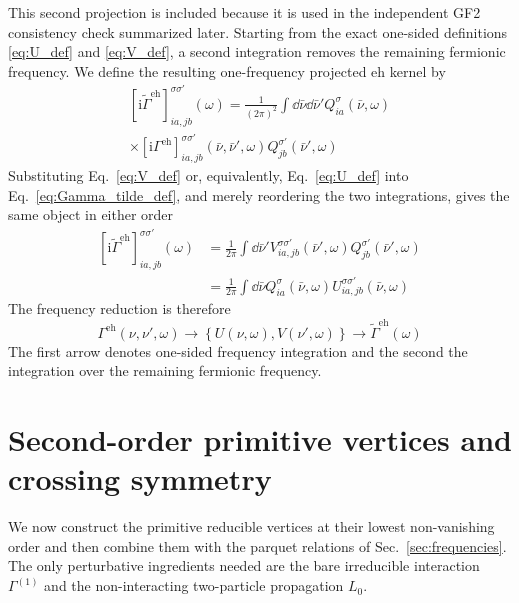 \documentclass[aip,jcp,reprint,noshowkeys,superscriptaddress]{revtex4-1}
\newcommand{\ii}{\mathrm{i}}
\newcommand{\eh}{\text{eh}}
\begin{document}
This second projection is included because it is used
in the independent GF2 consistency check summarized later.
Starting from the exact one-sided definitions
\eqref{eq:U_def} and \eqref{eq:V_def}, a second integration removes the
remaining fermionic frequency.
We define the resulting one-frequency projected $\eh$ kernel by
\begin{multline}
	\left[
	\ii\widetilde{\Gamma}^\eh
	\right]^{\sigma\sigma'}_{ia,jb}(\omega)
	=
	\frac{1}{(2\pi)^2}
	\int \dd{\bar\nu}\dd{\bar\nu'}
	Q^\sigma_{ia}(\bar\nu,\omega)
	\\
	\times
	\left[
	\ii\Gamma^\eh
	\right]^{\sigma\sigma'}_{ia,jb}(\bar\nu,\bar\nu',\omega)
	Q^{\sigma'}_{jb}(\bar\nu',\omega)
	\label{eq:Gamma_tilde_def}
\end{multline}
Substituting Eq.~\eqref{eq:V_def} or, equivalently,
Eq.~\eqref{eq:U_def} into Eq.~\eqref{eq:Gamma_tilde_def}, and merely
reordering the two integrations, gives the same object in either order
\begin{align}
	\left[
	\ii\widetilde{\Gamma}^\eh
	\right]^{\sigma\sigma'}_{ia,jb}(\omega)
	&=
	\frac{1}{2\pi}
	\int \dd{\bar\nu'}
	V^{\sigma\sigma'}_{ia,jb}(\bar\nu',\omega)
	Q^{\sigma'}_{jb}(\bar\nu',\omega)
	\label{eq:Gamma_tilde_from_V}
	\\
	&=
	\frac{1}{2\pi}
	\int \dd{\bar\nu}
	Q^\sigma_{ia}(\bar\nu,\omega)
	U^{\sigma\sigma'}_{ia,jb}(\bar\nu,\omega)
	\label{eq:Gamma_tilde_from_U}
\end{align}
The frequency reduction is therefore
\begin{equation}
	\Gamma^\eh(\nu,\nu',\omega)
	\longrightarrow
	\left\{
	U(\nu,\omega),V(\nu',\omega)
	\right\}
	\longrightarrow
	\widetilde{\Gamma}^\eh(\omega)
	\label{eq:frequency_reduction}
\end{equation}
The first arrow denotes one-sided frequency integration and the second the
integration over the remaining fermionic frequency.

\section{Second-order primitive vertices and crossing symmetry}
\label{sec:second_order_primitives}

We now construct the primitive reducible vertices at their lowest
non-vanishing order and then combine them with the parquet relations of
Sec.~\ref{sec:frequencies}.
The only perturbative ingredients needed are the bare irreducible interaction
$\Gamma^{(1)}$ and the non-interacting two-particle propagation $L_0$.
\end{document}
